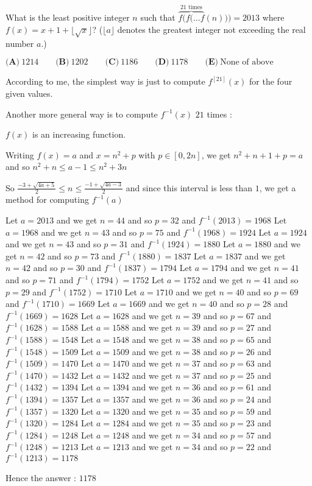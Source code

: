 \begin{solution}
	\begin{tcolorbox}What is the least positive integer $n$ such that $\overbrace{f(f(\dots f}^{21 \text{ times}}(n)))=2013$ where $f(x)=x+1+\lfloor \sqrt x \rfloor$? ($\lfloor a \rfloor$ denotes the greatest integer not exceeding the real number $a$.)

$ 
\textbf{(A)}\ 1214
\qquad\textbf{(B)}\ 1202
\qquad\textbf{(C)}\ 1186
\qquad\textbf{(D)}\ 1178
\qquad\textbf{(E)}\ \text{None of above}
$\end{tcolorbox}
According to me, the simplest way is just to compute $f^{[21]}(x)$ for the four given values.

Another more general way is to compute $f^{-1}(x)$ $21$ times :

$f(x)$ is an increasing function.

Writing $f(x)=a$ and $x=n^2+p$ with $p\in[0,2n]$, we get $n^2+n+1+p=a$ and so $n^2+n\le a-1\le n^2+3n$

So $\frac{-3+\sqrt{4a+5}}2\le n\le\frac{-1+\sqrt{4a-3}}2$ and since this interval is less than $1$, we get a method for computing $f^{-1}(a)$

Let $a=2013$ and we get $n=44$ and so $p=32$ and $f^{-1}(2013)=1968$
Let $a=1968$ and we get $n=43$ and so $p=75$ and $f^{-1}(1968)=1924$
Let $a=1924$ and we get $n=43$ and so $p=31$ and $f^{-1}(1924)=1880$
Let $a=1880$ and we get $n=42$ and so $p=73$ and $f^{-1}(1880)=1837$
Let $a=1837$ and we get $n=42$ and so $p=30$ and $f^{-1}(1837)=1794$
Let $a=1794$ and we get $n=41$ and so $p=71$ and $f^{-1}(1794)=1752$
Let $a=1752$ and we get $n=41$ and so $p=29$ and $f^{-1}(1752)=1710$
Let $a=1710$ and we get $n=40$ and so $p=69$ and $f^{-1}(1710)=1669$
Let $a=1669$ and we get $n=40$ and so $p=28$ and $f^{-1}(1669)=1628$
Let $a=1628$ and we get $n=39$ and so $p=67$ and $f^{-1}(1628)=1588$
Let $a=1588$ and we get $n=39$ and so $p=27$ and $f^{-1}(1588)=1548$
Let $a=1548$ and we get $n=38$ and so $p=65$ and $f^{-1}(1548)=1509$
Let $a=1509$ and we get $n=38$ and so $p=26$ and $f^{-1}(1509)=1470$
Let $a=1470$ and we get $n=37$ and so $p=63$ and $f^{-1}(1470)=1432$
Let $a=1432$ and we get $n=37$ and so $p=25$ and $f^{-1}(1432)=1394$
Let $a=1394$ and we get $n=36$ and so $p=61$ and $f^{-1}(1394)=1357$
Let $a=1357$ and we get $n=36$ and so $p=24$ and $f^{-1}(1357)=1320$
Let $a=1320$ and we get $n=35$ and so $p=59$ and $f^{-1}(1320)=1284$
Let $a=1284$ and we get $n=35$ and so $p=23$ and $f^{-1}(1284)=1248$
Let $a=1248$ and we get $n=34$ and so $p=57$ and $f^{-1}(1248)=1213$
Let $a=1213$ and we get $n=34$ and so $p=22$ and $f^{-1}(1213)=1178$

Hence the answer : $\boxed{1178}$
\end{solution}




